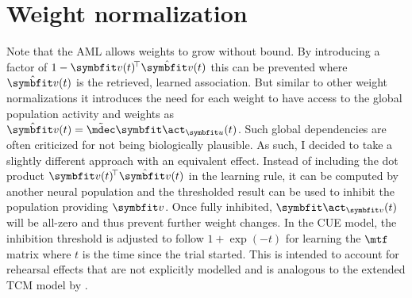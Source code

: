 \section{Weight normalization}
Note that the AML allows weights to grow without bound.
By introducing a factor of $1 - \vc v(t)\!\Tr \hat{\vc v}(t)$ this can be prevented where $\hat{\vc v}(t)$ is the retrieved, learned association.
But similar to other weight normalizations it introduces the need for each weight to have access to the global population activity and weights as $\hat{\vc v}(t) = \tilde{\mdec} \vc\act_{\vc u}(t)$.
Such global dependencies are often criticized for not being biologically plausible.
As such, I decided to take a slightly different approach with an equivalent effect.
Instead of including the dot product $\vc v(t)\!\Tr \hat{\vc v}(t)$ in the learning rule, it can be computed by another neural population and the thresholded result can be used to inhibit the population providing $\vc v$.
Once fully inhibited, $\vc\act_{\vc v}(t)$ will be all-zero and thus prevent further weight changes.
In the CUE model, the inhibition threshold is adjusted to follow $1 + \exp(-t)$ for learning the $\mtf$ matrix where $t$ is the time since the trial started.
This is intended to account for rehearsal effects that are not explicitly modelled and is analogous to the extended TCM model by \textcite{Sederberg2008}.
